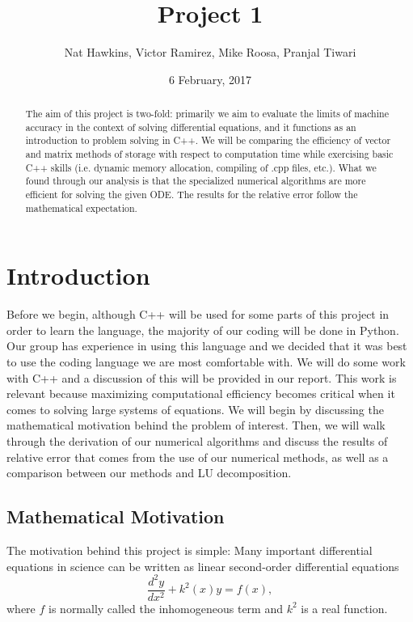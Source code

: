 \documentclass{article}
\title{Project 1}
\author{Nat Hawkins, Victor Ramirez, Mike Roosa, Pranjal Tiwari}
\date{6 February, 2017}
\begin{document}
\maketitle

\begin{abstract}
The aim of this project is two-fold: primarily we aim to evaluate the limits of machine accuracy in the context of solving differential equations, and it functions as an introduction to problem solving in C++. We will be comparing the efficiency of vector and matrix methods of storage with respect to computation time while exercising basic C++ skills (i.e. dynamic memory allocation, compiling of .cpp files, etc.). What we found through our analysis is that the specialized numerical algorithms are more efficient for solving the given ODE. The results for the relative error follow the mathematical expectation.
\end{abstract}

\section{Introduction}
	Before we begin, although C++ will be used for some parts of this project in order to learn the language, the majority of our coding will be done in Python. Our group has experience in using this language and we decided that it was best to use the coding language we are most comfortable with. We will do some work with C++ and a discussion of this will be provided in our report. This work is relevant because maximizing computational efficiency becomes critical when it comes to solving large systems of equations. We will begin by discussing the mathematical motivation behind the problem of interest. Then, we will walk through the derivation of our numerical algorithms and discuss the results of relative error that comes from the use of our numerical methods, as well as a comparison between our methods and LU decomposition.
	
	\subsection{Mathematical Motivation}
		The motivation behind this project is simple: Many important differential equations in science can be written as 	linear second-order differential equations
		\begin{equation*}
		\frac{d^2y}{dx^2}+k^2(x)y = f(x),
		\end{equation*}
		where $f$ is normally called the inhomogeneous term and $k^2$ is a real function.
		
\end{document}

